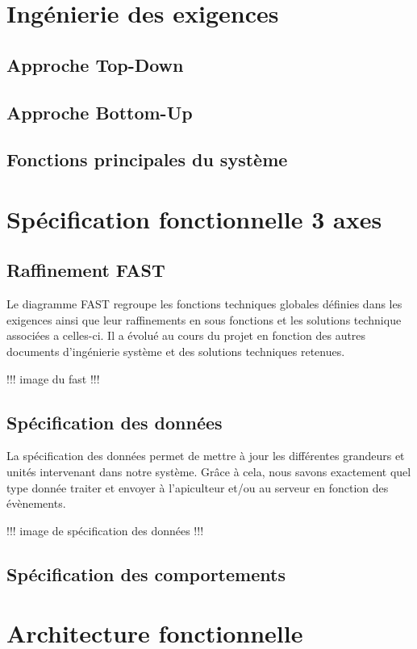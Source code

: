 \chapter{Ingénierie des exigences}
\section{Approche Top-Down}
\label{sec:top-down}

\section{Approche Bottom-Up}

\section{Fonctions principales du système}

\chapter{Spécification fonctionnelle  3 axes}

\section{Raffinement FAST}
Le diagramme FAST regroupe les fonctions techniques globales définies dans les 
exigences ainsi que leur raffinements en sous fonctions et les solutions technique 
associées a celles-ci. Il a évolué au cours du projet en fonction des autres documents 
d'ingénierie système et des solutions techniques retenues. 

!!!  image du fast  !!!

\section{Spécification des données}
La spécification des données permet de mettre à jour les différentes grandeurs 
et unités intervenant dans notre système. Grâce à cela, nous savons exactement 
quel type donnée traiter et envoyer à l'apiculteur et/ou au serveur en fonction des évènements.

!!!  image de spécification des données  !!!

\section{Spécification des comportements}


\chapter{Architecture fonctionnelle}


